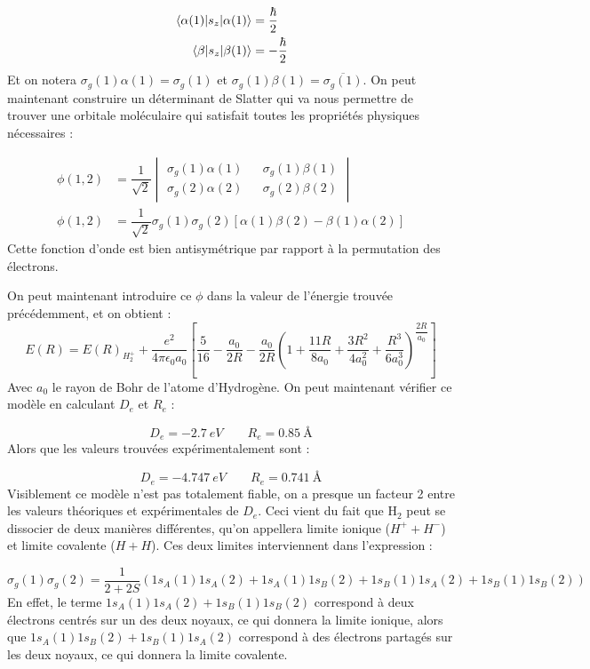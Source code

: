 \begin{align*}
    \mel{\alpha(1)}{s_z}{\alpha(1)} &= \dfrac{\hbar}{2}\\
    \mel{\beta}{s_z}{\beta(1)} &= -\dfrac{\hbar}{2}
\end{align*}
Et on notera $\sigma_g(1)\alpha(1) = \sigma_g(1)$ et $\sigma_g(1)\beta(1) = \overline{\sigma_g(1)}$. On peut maintenant construire un déterminant de Slatter qui va nous permettre de trouver une orbitale moléculaire qui satisfait toutes les propriétés physiques nécessaires :

\begin{align*}
    \phi(1,2) &= \dfrac{1}{\sqrt{2}}
    \begin{vmatrix}
        \sigma_g(1)\alpha(1) && \sigma_g(1)\beta(1)\\
        \sigma_g(2)\alpha(2) && \sigma_g(2)\beta(2)
    \end{vmatrix}\\
    \phi(1,2) &= \dfrac{1}{\sqrt{2}}\sigma_g(1)\sigma_g(2)[\alpha(1)\beta(2)-\beta(1)\alpha(2)]
\end{align*}
Cette fonction d'onde est bien antisymétrique par rapport à la permutation des électrons.


On peut maintenant introduire ce $\phi$ dans la valeur de l'énergie trouvée précédemment, et on obtient :
\[
    E(R) = E(R)_{H^+_2} + \dfrac{e^2}{4\pi\epsilon_0a_0}\left[\dfrac{5}{16}-\dfrac{a_0}{2R}-\dfrac{a_0}{2R}\left(1+\dfrac{11R}{8a_0}+\dfrac{3R^2}{4a_0^2}+\dfrac{R^3}{6a_0^3}\right)^{\dfrac{2R}{a_0}}\right]
\]
Avec $a_0$ le rayon de Bohr de l'atome d'Hydrogène. On peut maintenant vérifier ce modèle en calculant $D_e$ et $R_e$ :

\[ D_e = \SI{-2.7}{eV} \quad \quad R_e = \SI{0.85}{\angstrom} \]
Alors que les valeurs trouvées expérimentalement sont :

\[ D_e = \SI{-4.747}{eV} \quad \quad R_e = \SI{0.741}{\angstrom} \]
Visiblement ce modèle n'est pas totalement fiable, on a presque un facteur 2 entre les valeurs théoriques et expérimentales de $D_e$. Ceci vient du fait que H$_2$ peut se dissocier de deux manières différentes, qu'on appellera limite ionique ($H^+ + H^-$) et limite covalente ($H+H$). Ces deux limites interviennent dans l'expression :

\[
    \sigma_g(1)\sigma_g(2) = \dfrac{1}{2+2S}(1s_A(1)1s_A(2)+1s_A(1)1s_B(2)+1s_B(1)1s_A(2)+1s_B(1)1s_B(2))
\]
En effet, le terme $1s_A(1)1s_A(2)+1s_B(1)1s_B(2)$ correspond à deux électrons centrés sur un des deux noyaux, ce qui donnera la limite ionique, alors que $1s_A(1)1s_B(2)+1s_B(1)1s_A(2)$ correspond à des électrons partagés sur les deux noyaux, ce qui donnera la limite covalente.

